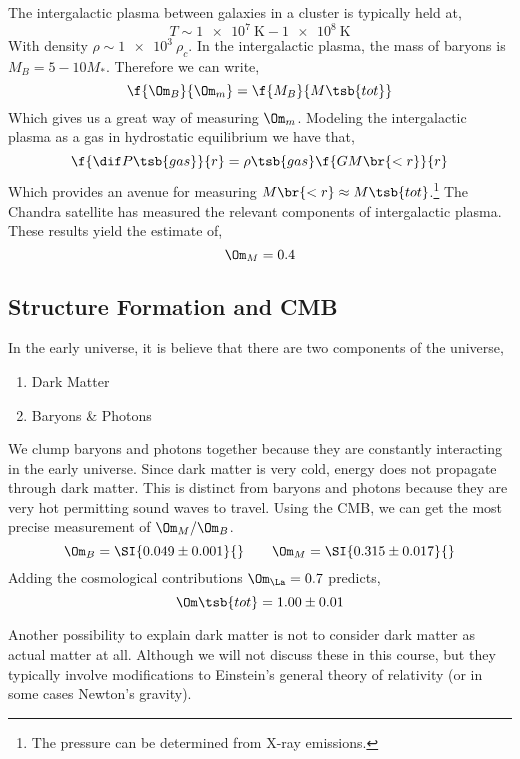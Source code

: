 \documentclass{article}
\begin{document}
The intergalactic plasma between galaxies in a cluster is typically held at,
\[ T \sim \SI{1e7}{\K} - \SI{1e8}{\K} \]
With density $\rho \sim \SI{1e3}{}\rho_c$. In the intergalactic plasma, the mass of baryons is $M_B = 5-10 M_{*}$. Therefore we can write,
\[ \f{\Om_B}{\Om_m} = \f{M_B}{M\tsb{tot}} \]
Which gives us a great way of measuring $\Om_m$. Modeling the intergalactic plasma as a gas in hydrostatic equilibrium we have that,
\[ \f{\dif P\tsb{gas}}{r} = \rho\tsb{gas} \f{GM\br{<r}}{r} \]
Which provides an avenue for measuring $M\br{<r} \approx M\tsb{tot}$.\footnote{The pressure can be determined from X-ray emissions.} The Chandra satellite has measured the relevant components of intergalactic plasma. These results yield the estimate of,
\[ \Om_M = 0.4 \]

\subsection{Structure Formation and CMB}

In the early universe, it is believe that there are two components of the universe,
\begin{enumerate}
    \item Dark Matter
    \item Baryons \& Photons
\end{enumerate}
We clump baryons and photons together because they are constantly interacting in the early universe. Since dark matter is very cold, energy does not propagate through dark matter. This is distinct from baryons and photons because they are very hot permitting sound waves to travel. Using the CMB, we can get the most precise measurement of $\Om_M / \Om_B$.
\[ \Om_B = \SI{0.049\pm0.001}{} \qquad \Om_M = \SI{0.315\pm0.017}{} \]
Adding the cosmological contributions $\Om_{\La} = 0.7$ predicts,
\[ \Om\tsb{tot} = 1.00 \pm 0.01 \]

Another possibility to explain dark matter is not to consider dark matter as actual matter at all. Although we will not discuss these in this course, but they typically involve modifications to Einstein's general theory of relativity (or in some cases Newton's gravity).
\end{document}
